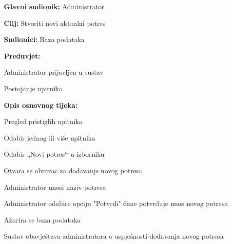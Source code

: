 					\noindent {}
					\begin{packed_item}
	
						\item \textbf{Glavni sudionik:} Administrator
						\item \textbf{Cilj:} Stvoriti novi aktualni potres
						\item \textbf{Sudionici:} Baza podataka
						\item \textbf{Preduvjet:} 
						\begin{packed_item}
							\item Administrator prijavljen u sustav
							\item Postojanje upitnika
						\end{packed_item}
						            
						\item \textbf{Opis osnovnog tijeka:}
						
						\item[] \begin{packed_enum}
	
							\item Pregled pristiglih upitnika
							\item Odabir jednog ili više upitnika
							\item Odabir „Novi potres“ u izborniku
							\item Otvara se obrazac za dodavanje novog potresa
							\item Administrator unosi naziv potresa
							\item Administrator odabire opciju "Potvrdi" čime potvrđuje unos novog potresa
							\item Ažurira se baza podataka
							\item Sustav obavještava administratora o uspješnosti dodavanja novog potresa
							
						\end{packed_enum}
					\end{packed_item}


